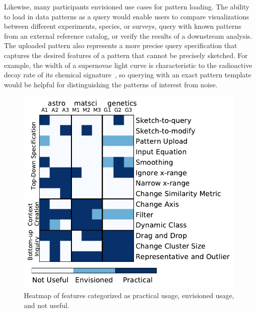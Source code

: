 \par Likewise, many participants envisioned use cases for pattern loading. The ability to load in data patterns as a query would enable users to compare visualizations between different experiments, species, or surveys, query with known patterns from an external reference catalog, or verify the results of a downstream analysis. The uploaded pattern also represents a more precise query specification that captures the desired features of a pattern that cannot be precisely sketched. For example, the width of a supernovae light curve is characteristic to the radioactive decay rate of its chemical signature~\cite{Nugent1997}, so querying with an exact pattern template would be helpful for distinguishing the patterns of interest from noise.

\begin{figure}[h!]
  \includegraphics[width=0.8\linewidth]{figures/PENcoding.pdf}
  \caption{Heatmap of features categorized as practical usage, envisioned usage, and not useful. }
  \label{fig:feature_heatmap}
\end{figure}
